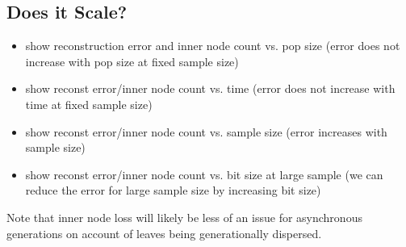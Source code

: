 \subsection{Does it Scale?} \label{sec:scaling}



\begin{itemize}
    \item show reconstruction error and inner node count vs. pop size (error does not increase with pop size at fixed sample size)
    \item show reconst error/inner node count vs. time (error does not increase with time at fixed sample size)
    \item show reconst error/inner node count vs. sample size (error increases with sample size)
    \item show reconst error/inner node count vs. bit size at large sample (we can reduce the error for large sample size by increasing bit size)
\end{itemize}

Note that inner node loss will likely be less of an issue for asynchronous generations on account of leaves being generationally dispersed.
